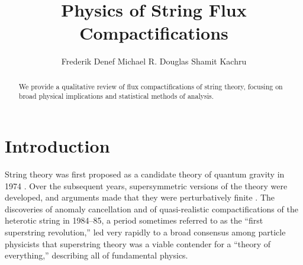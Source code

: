 \documentclass[aps,amsfonts]{ar2e}
\begin{document}
\def\a{{\alpha}}
\def\ap{{l_s^2}}
\def\b{{\beta}}
\def\d{{\delta}}
\def\g{{\gamma}}
\def\e{{\epsilon}}
\def\z{{\zeta}}
\def\ve{{\varepsilon}}
\def\vf{{\varphi}}
\def\kk{{\kappa}}
\def\m{{\mu}}
\def\n{{\nu}}
\def\u{{\Upsilon}}
\def\l{{\lambda}}
\def\s{{\sigma}}
\def\t{{\theta}}
\def\o{{\omega}}
%
\def\seealso{{See also }}
\def\hepth#1{}
\def\hepph#1{}
%
\title{Physics of String Flux Compactifications}

\author{Frederik Denef
 Michael R. Douglas
 Shamit Kachru
}

\begin{abstract}
We provide a qualitative review of flux compactifications of string
theory, focusing on broad physical implications and statistical
methods of analysis.


\end{abstract}


\maketitle



\startdocument
\section{Introduction}
\label{sec:intro}

String theory was first proposed as a candidate theory of quantum
gravity in 1974 \cite{Scherk:1974mc}.  Over the subsequent years,
supersymmetric versions of the theory were developed, and arguments
made that they were perturbatively finite
\cite{Schwarz:1982jn}.
The discoveries of anomaly cancellation
\cite{Green:1984sg}
and of quasi-realistic compactifications of the heterotic string
\cite{Candelas:1985en} in 1984--85, a period sometimes
referred to as the ``first superstring revolution,'' led very
rapidly to a broad consensus among particle physicists that
superstring theory was a viable contender for a ``theory of
everything,'' describing all of fundamental physics.
\end{document}
